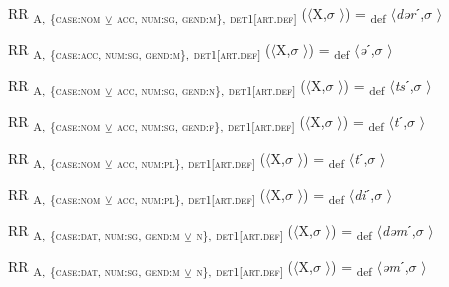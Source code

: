 \ea%
\label{ex:key:118}
 RR \textsubscript{A,} \textsubscript{\{\textsc{case:nom}} \textsubscript{\tiny $\veebar$}\textsubscript{ \textsc{acc}}\textsubscript{, \textsc{num:sg}, \textsc{gend:m}\},} \textsubscript{\textsc{det1[art.def]}} ($\langle$X,$\sigma$ $\rangle$) = \textsubscript{def} $\langle$\textit{də}\textit{r}ˊ,$\sigma$ $\rangle$
\z

\ea%
\label{ex:key:119}
 RR \textsubscript{A,} \textsubscript{\{\textsc{case:}}\textsubscript{\textsc{acc}}\textsubscript{, \textsc{num:sg}, \textsc{gend:m}\},} \textsubscript{\textsc{det1[art.def]}} ($\langle$X,$\sigma$ $\rangle$) = \textsubscript{def} $\langle$\textit{ə}ˊ,$\sigma$ $\rangle$
\z

\ea%
\label{ex:key:120}
 RR \textsubscript{A,} \textsubscript{\{\textsc{case:nom}} \textsubscript{\tiny $\veebar$}\textsubscript{ \textsc{acc}}\textsubscript{, \textsc{num:sg}, \textsc{gend:n}\},} \textsubscript{\textsc{det1[art.def]}} ($\langle$X,$\sigma$ $\rangle$) = \textsubscript{def} $\langle$\textit{ts}ˊ,$\sigma$ $\rangle$
\z

\ea%
\label{ex:key:121}
 RR \textsubscript{A,} \textsubscript{\{\textsc{case:nom}} \textsubscript{\tiny $\veebar$}\textsubscript{ \textsc{acc}}\textsubscript{, \textsc{num:sg}, \textsc{gend:f}\},} \textsubscript{\textsc{det1[art.def]}} ($\langle$X,$\sigma$ $\rangle$) = \textsubscript{def} $\langle$\textit{t}ˊ,$\sigma$ $\rangle$
\z

\ea%
\label{ex:key:122}
 RR \textsubscript{A,} \textsubscript{\{\textsc{case:nom}} \textsubscript{\tiny $\veebar$}\textsubscript{ \textsc{acc}}\textsubscript{, \textsc{num:pl}\},} \textsubscript{\textsc{det1[art.def]}} ($\langle$X,$\sigma$ $\rangle$) = \textsubscript{def} $\langle$\textit{t}ˊ,$\sigma$ $\rangle$
\z

\ea%
\label{ex:key:123}
 RR \textsubscript{A,} \textsubscript{\{\textsc{case:nom}} \textsubscript{\tiny $\veebar$}\textsubscript{ \textsc{acc}}\textsubscript{, \textsc{num:pl}\},} \textsubscript{\textsc{det1[art.def]}} ($\langle$X,$\sigma$ $\rangle$) = \textsubscript{def} $\langle$\textit{di}ˊ,$\sigma$ $\rangle$
\z

\ea%
\label{ex:key:124}
 RR \textsubscript{A,} \textsubscript{\{\textsc{case:dat}, \textsc{num:sg}, \textsc{gend:m}} \textsubscript{\tiny $\veebar$} \textsubscript{\scshape n}\textsubscript{\},} \textsubscript{\textsc{det1[art.def]}} ($\langle$X,$\sigma$ $\rangle$) = \textsubscript{def} $\langle$\textit{də}\textit{m}ˊ,$\sigma$ $\rangle$
\z

\ea%
\label{ex:key:125}
 RR \textsubscript{A,} \textsubscript{\{\textsc{case:dat}, \textsc{num:sg}, \textsc{gend:m}} \textsubscript{\tiny $\veebar$} \textsubscript{\scshape n}\textsubscript{\},} \textsubscript{\textsc{det1[art.def]}} ($\langle$X,$\sigma$ $\rangle$) = \textsubscript{def} $\langle$\textit{əm}ˊ,$\sigma$ $\rangle$
\z

